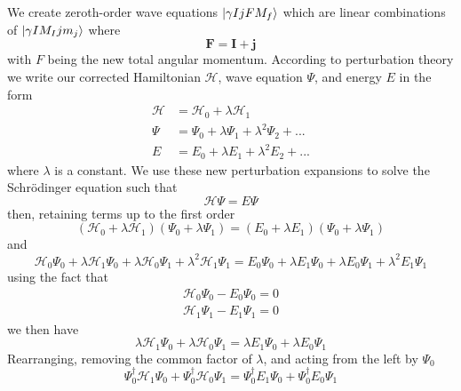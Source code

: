 We create zeroth-order wave equations \(\ket{\gamma IjFM_f}\) which are linear combinations of \(\ket{\gamma IM_I jm_j}\) where
\begin{equation}
    \mathbf{F}= \mathbf{I} + \mathbf{j}
\end{equation}
with $F$ being the new total angular momentum. According to perturbation theory we write our corrected Hamiltonian $\mathscr{H}$, wave equation $\Psi$, and energy $E$ in the form
\begin{equation}
    \begin{split}
        \mathscr{H}&=\mathscr{H}_0+\lambda\mathscr{H}_1\\
        \Psi&=\Psi_0+\lambda\Psi_1+\lambda^2 \Psi_2+...\\
        E&=E_0+\lambda E_1+\lambda^2 E_2+...
    \end{split}
\end{equation}
where $\lambda$ is a constant. We use these new perturbation expansions to solve the Schr\"odinger equation such that
\begin{equation}
    \mathscr{H}\Psi= E\Psi
\end{equation}
then, retaining terms up to the first order
\begin{equation}
   (\mathscr{H}_0+\lambda\mathscr{H}_1)(\Psi_0+\lambda\Psi_1)=
   (E_0+\lambda E_1)(\Psi_0+\lambda\Psi_1)
\end{equation}
and
\begin{equation}
   \mathscr{H}_0\Psi_0+ \lambda\mathscr{H}_1\Psi_0
   +
   \lambda\mathscr{H}_0\Psi_1+\lambda^2\mathscr{H}_1\Psi_1=
   E_0\Psi_0+\lambda E_1\Psi_0+\lambda E_0 \Psi_1+ \lambda^2E_1\Psi_1 
\end{equation}
using the fact that
\begin{equation}
\begin{split}
        \mathscr{H}_0\Psi_0-E_0\Psi_0=0\\
        \mathscr{H}_1\Psi_1-E_1\Psi_1=0
\end{split}
\end{equation}
we then have
\begin{equation}
   \lambda\mathscr{H}_1\Psi_0
   +
   \lambda\mathscr{H}_0\Psi_1=
   \lambda E_1\Psi_0+\lambda E_0 \Psi_1 
\end{equation}
Rearranging, removing the common factor of $\lambda$, and acting from the left by $\Psi_0$
\begin{equation}
   \Psi_0^\dagger \mathscr{H}_1\Psi_0
   +
   \Psi_0^\dagger \mathscr{H}_0\Psi_1=
   \Psi_0^\dagger E_1\Psi_0+ \Psi_0^\dagger E_0 \Psi_1 
\end{equation}
